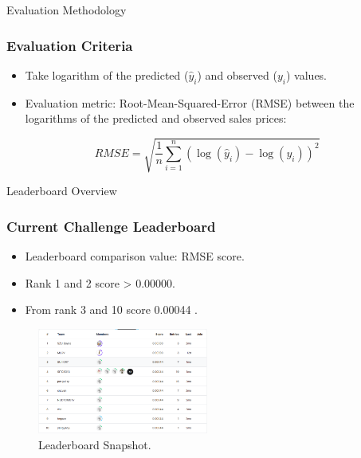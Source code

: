 \begin{frame}{Evaluation Methodology}
    \frametitle{Evaluation Criteria}
    \begin{itemize}
        \item Take logarithm of the predicted (\(\hat{y}_i\)) and observed (\(y_i\)) values.
        \item Evaluation metric: Root-Mean-Squared-Error (RMSE) between the logarithms of the predicted and observed sales prices:
    \end{itemize}
    \vspace{0.5cm}
    \begin{equation}
        RMSE = \sqrt{\frac{1}{n}\sum_{i=1}^{n} (\log(\hat{y}_i) - \log(y_i))^2}
        \label{eq:rmse}
    \end{equation}
\end{frame}

\begin{frame}{Leaderboard Overview}
    \frametitle{Current Challenge Leaderboard}
    \begin{itemize}
        \item Leaderboard comparison value: RMSE score.
        \item Rank 1 and 2 score > 0.00000.
        \item From rank 3 and 10 score 0.00044 .
    \end{itemize}
    \vspace{0.5cm}
    \begin{figure}
        \includegraphics[width=0.5\textwidth]{figures/leaderboard_snapshot.png} 
        \caption{Leaderboard Snapshot.}
        \label{fig:leaderboard_snapshot}
    \end{figure}
\end{frame}

